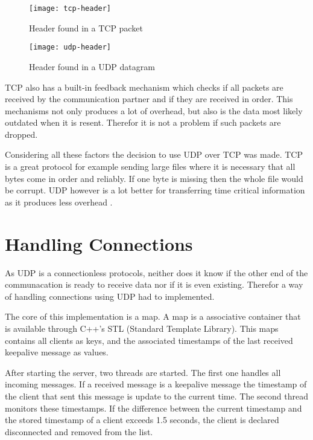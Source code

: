\begin{figure}[H]
    \centering
    \texttt{[image: tcp-header]}
    \caption{Header found in a TCP packet}
    \label{fig:tcp-header}
\end{figure}

\begin{figure}[H]
    \centering
    \texttt{[image: udp-header]}
    \caption{Header found in a UDP datagram}
    \label{fig:udp-header}
\end{figure}

TCP also has a built-in feedback mechanism which checks if all packets are received by the communication partner and if they are received in order. This mechanisms not only produces a lot of overhead, but also is the data
most likely outdated when it is resent. Therefor it is not a problem if such packets are dropped.

Considering all these factors the decision to use UDP over TCP was made. TCP is a great protocol for example sending large files where it is necessary that all bytes come in order and reliably. If one byte is missing
then the whole file would be corrupt. UDP however is a lot better for transferring time critical information as it produces less overhead \autocite{TCPUDPRTlifesize}.

\section {Handling Connections}

As UDP is a connectionless protocols, neither does it know if the other end of the communacation is ready to receive data nor if it is even existing. Therefor a way of handling connections using UDP had to implemented.

The core of this implementation is a map. A map is a associative container that is available through C++'s STL (Standard Template Library). This maps contains all clients as keys, and the associated timestamps of the last
received keepalive message as values.

After starting the server, two threads are started. The first one handles all incoming messages. If a received message is a keepalive message the timestamp of the client that sent this message is update
to the current time. The second thread monitors these timestamps. If the difference between the current timestamp and the stored timestamp of a client exceeds 1.5 seconds, the client is declared disconnected and removed
from the list.

